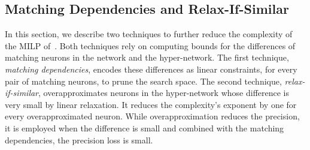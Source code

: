 \subsection{Matching Dependencies and Relax-If-Similar}\label{sec:overview_match}
In this section, we describe two techniques to further reduce the complexity of the MILP of~. 
Both techniques rely on computing bounds for the differences of matching neurons in the network and the hyper-network.
The first technique, \emph{matching dependencies}, encodes these differences as linear constraints, for every pair of matching neurons, to prune the search space. The second technique, \emph{relax-if-similar}, overapproximates neurons in the hyper-network whose difference is very small by linear relaxation. It reduces the complexity's exponent by one for every overapproximated neuron. While overapproximation reduces the precision, it is employed when the difference is small and combined with the matching dependencies, the precision loss is small. 
  

